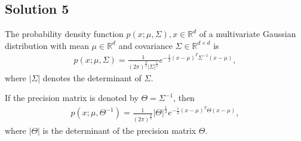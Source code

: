 \subsection*{Solution 5}
The probability density function $p(x;\mu,\Sigma), x\in \mathbb{R}^d$ of a multivariate Gaussian distribution with mean $\mu \in \mathbb{R}^d$ and covariance $\Sigma \in \mathbb{R}^{d\times d}$ is
\begin{align*}
	p(x;\mu,\Sigma) = \frac{1}{(2\pi)^{\frac{d}{2}} |\Sigma|^{\frac{1}{2}}}e^{-\frac{1}{2}(x-\mu)^T\Sigma^{-1}(x-\mu)},
\end{align*}
where $|\Sigma|$ denotes the determinant of $\Sigma$.

If the precision matrix is denoted by $\Theta = \Sigma^{-1}$, then
\begin{align*}
	p(x;\mu,\Theta^{-1}) = \frac{1}{(2\pi)^{\frac{d}{2}}}|\Theta|^{\frac{1}{2}}e^{-\frac{1}{2}(x-\mu)^T\Theta(x-\mu)},
\end{align*}
where $|\Theta|$ is the determinant of the precision matrix $\Theta$.

